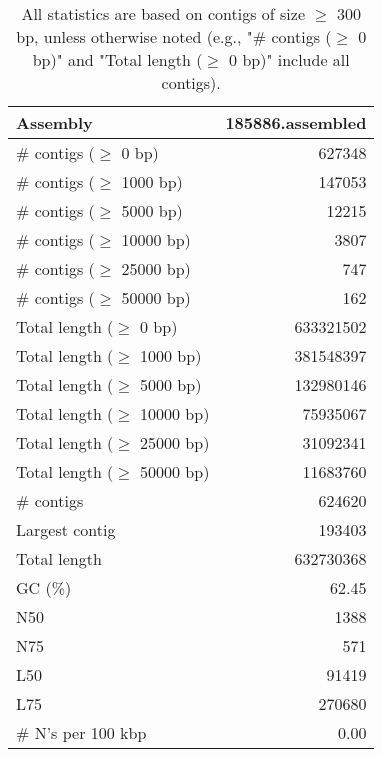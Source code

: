 \documentclass[12pt,a4paper]{article}
\begin{document}
\begin{table}[ht]
\begin{center}
\caption{All statistics are based on contigs of size $\geq$ 300 bp, unless otherwise noted (e.g., "\# contigs ($\geq$ 0 bp)" and "Total length ($\geq$ 0 bp)" include all contigs).}
\begin{tabular}{|l*{1}{|r}|}
\hline
Assembly & 185886.assembled \\ \hline
\# contigs ($\geq$ 0 bp) & 627348 \\ \hline
\# contigs ($\geq$ 1000 bp) & 147053 \\ \hline
\# contigs ($\geq$ 5000 bp) & 12215 \\ \hline
\# contigs ($\geq$ 10000 bp) & 3807 \\ \hline
\# contigs ($\geq$ 25000 bp) & 747 \\ \hline
\# contigs ($\geq$ 50000 bp) & 162 \\ \hline
Total length ($\geq$ 0 bp) & 633321502 \\ \hline
Total length ($\geq$ 1000 bp) & 381548397 \\ \hline
Total length ($\geq$ 5000 bp) & 132980146 \\ \hline
Total length ($\geq$ 10000 bp) & 75935067 \\ \hline
Total length ($\geq$ 25000 bp) & 31092341 \\ \hline
Total length ($\geq$ 50000 bp) & 11683760 \\ \hline
\# contigs & 624620 \\ \hline
Largest contig & 193403 \\ \hline
Total length & 632730368 \\ \hline
GC (\%) & 62.45 \\ \hline
N50 & 1388 \\ \hline
N75 & 571 \\ \hline
L50 & 91419 \\ \hline
L75 & 270680 \\ \hline
\# N's per 100 kbp & 0.00 \\ \hline
\end{tabular}
\end{center}
\end{table}
\end{document}
